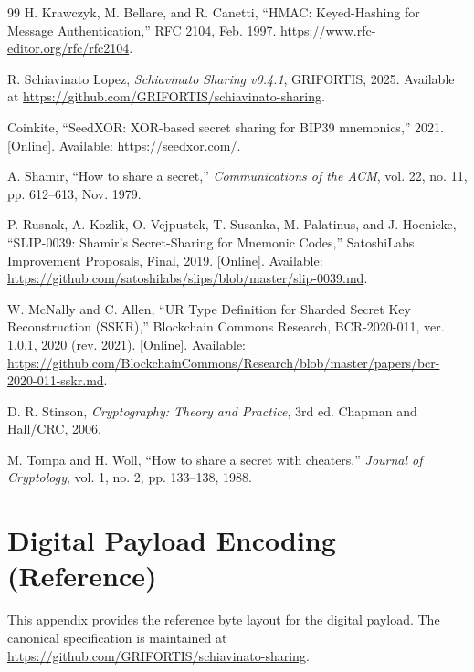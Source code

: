 \documentclass[11pt]{article}
\begin{document}
\begin{thebibliography}{99}
H. Krawczyk, M. Bellare, and R. Canetti,
``HMAC: Keyed-Hashing for Message Authentication,''
RFC 2104, Feb. 1997. \url{https://www.rfc-editor.org/rfc/rfc2104}.

R. Schiavinato Lopez,
\textit{Schiavinato Sharing v0.4.1}, GRIFORTIS, 2025.
Available at \url{https://github.com/GRIFORTIS/schiavinato-sharing}.

Coinkite,
``SeedXOR: XOR-based secret sharing for BIP39 mnemonics,'' 2021.
[Online]. Available: \url{https://seedxor.com/}.

A. Shamir,
``How to share a secret,''
\textit{Communications of the ACM}, vol. 22, no. 11, pp. 612--613, Nov. 1979.

P. Rusnak, A. Kozlik, O. Vejpustek, T. Susanka, M. Palatinus, and J. Hoenicke,
``SLIP-0039: Shamir's Secret-Sharing for Mnemonic Codes,''
SatoshiLabs Improvement Proposals, Final, 2019.
[Online]. Available: \url{https://github.com/satoshilabs/slips/blob/master/slip-0039.md}.

W. McNally and C. Allen,
``UR Type Definition for Sharded Secret Key Reconstruction (SSKR),''
Blockchain Commons Research, BCR-2020-011, ver. 1.0.1, 2020
(rev. 2021). [Online]. Available: \url{https://github.com/BlockchainCommons/Research/blob/master/papers/bcr-2020-011-sskr.md}.

D. R. Stinson,
\textit{Cryptography: Theory and Practice}, 3rd ed.
Chapman and Hall/CRC, 2006.

M. Tompa and H. Woll,
``How to share a secret with cheaters,''
\textit{Journal of Cryptology}, vol. 1, no. 2, pp. 133--138, 1988.

\end{thebibliography}

\appendix

\section{Digital Payload Encoding (Reference)}
\label{app:encoding}

This appendix provides the reference byte layout for the digital payload. The canonical specification is maintained at \url{https://github.com/GRIFORTIS/schiavinato-sharing}.
\end{document}

